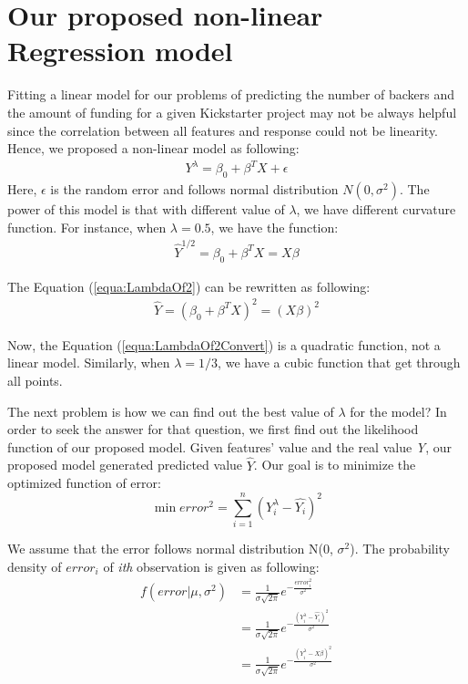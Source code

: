\section{Our proposed non-linear Regression model}
Fitting a linear model for our problems of predicting the number of backers and the amount of funding for a given Kickstarter project may not be always helpful since the correlation between all features and response could not be linearity.  Hence, we proposed a non-linear model as following:
\begin{equation}
\begin{aligned}
Y^\lambda = \beta_0 + \beta^TX + \epsilon
\end{aligned}
\end{equation}
Here, $\epsilon$ is the random error and follows normal distribution $N(0, \sigma^2)$. The power of this model is that with different value of $\lambda$, we have different curvature function. For instance, when $\lambda=0.5$, we have the function:
\begin{equation}
\label{equa:LambdaOf2}
\begin{aligned}
\widehat{Y}^{1/2} = \beta_0 + \beta^TX = X\beta
\end{aligned}
\end{equation}

The Equation (\ref{equa:LambdaOf2}) can be rewritten as following:
\begin{equation}
\label{equa:LambdaOf2Convert}
\begin{aligned}
\widehat{Y} = (\beta_0 + \beta^TX) ^2 = (X\beta)^2
\end{aligned}
\end{equation}

Now, the Equation (\ref{equa:LambdaOf2Convert}) is a quadratic function, not a linear model. Similarly, when $\lambda=1/3$, we have a cubic function that get through all points.

The next problem is how we can find out the best value of $\lambda$ for the model? In order to seek the answer for that question, we first find out the likelihood function of our proposed model. Given features' value and the real value \emph{Y}, our proposed model generated predicted value $\widehat{Y}$.  Our goal is to minimize the optimized function of error:
\[
	\min error^2 = \sum_{i=1}^{n}{(Y_i^\lambda -\widehat{Y_i})^2}
\]

We assume that the error follows normal distribution N(0, $\sigma^2$). The probability density of $error_i$ of \emph{ith} observation is given as following:
\begin{equation}
\label{equa:densityProbability}
\begin{aligned}
	f(error|\mu, \sigma^2) 	&= \frac{1}{\sigma\sqrt{2\pi}}e^{-\frac{error_i^2}{\sigma^2}} \\
						&= \frac{1}{\sigma\sqrt{2\pi}}e^{-\frac{{(Y_i^\lambda -\widehat{Y_i})^2}}{\sigma^2}} \\
						&= \frac{1}{\sigma\sqrt{2\pi}}e^{-\frac{{(Y_i^\lambda -X\beta)^2}}{\sigma^2}}
\end{aligned}			
\end{equation}

